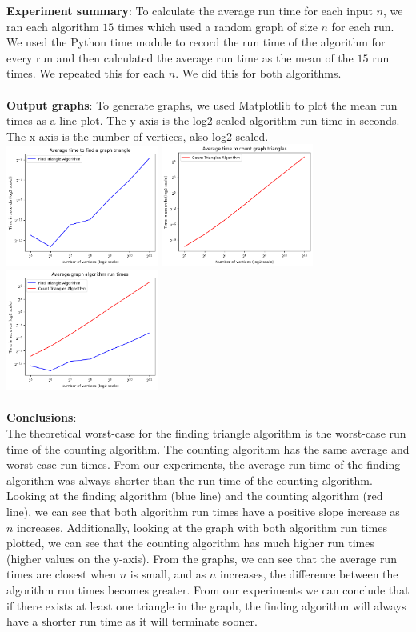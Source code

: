 \documentclass{article}
\begin{document}
    \textbf{Experiment summary}: To calculate the average run time for each input $n$, we ran each algorithm $15$ times which used a random graph of size $n$ for each run. We used the Python time module to record the run time of the algorithm for every run and then calculated the average run time as the mean of the $15$ run times. We repeated this for each $n$. We did this for both algorithms.
    \\\\
    \textbf{Output graphs}: To generate graphs, we used Matplotlib to plot the mean run times as a line plot. The y-axis is the log2 scaled algorithm run time in seconds. The x-axis is the number of vertices, also log2 scaled.\\  
    \includegraphics[width=50mm]{graph 1.png}
    \includegraphics[width=50mm]{graph 2.png}\\
    \includegraphics[width=50mm]{graph 3.png}
    \\\\
    \textbf{Conclusions}:\\
    The theoretical worst-case for the finding triangle algorithm is the worst-case run time of the counting algorithm. The counting algorithm has the same average and worst-case run times. From our experiments, the average run time of the finding algorithm was always shorter than the run time of the counting algorithm.  Looking at the finding algorithm (blue line) and the counting algorithm (red line), we can see that both algorithm run times have a positive slope increase as $n$ increases. Additionally, looking at the graph with both algorithm run times plotted, we can see that the counting algorithm has much higher run times (higher values on the y-axis). From the graphs, we can see that the average run times are closest when $n$ is small, and as $n$ increases, the difference between the algorithm run times becomes greater. From our experiments we can conclude that if there exists at least one triangle in the graph, the finding algorithm will always have a shorter run time as it will terminate sooner.  
    
\end{document}
